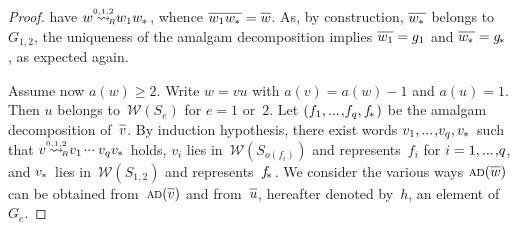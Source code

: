 \documentclass{amsart}
\numberwithin{equation}{section}
\theoremstyle{plain}
\theoremstyle{definition}
\let\ge=\geqslant
\begin{document}
\begin{proof}
have ${w} {\mathrel{{\mathrel{\overset{\scriptscriptstyle 0,1,2}{\rightsquigarrow}}}_{\hspace{-0.9ex}{\scriptscriptstyle R}}}} {w}_1 {{w}_{\hspace{-0.1ex}*\hspace{0.2ex}}}$, whence ${\overline{\vrule width0pt height5pt{{w}_1 {{w}_{\hspace{-0.1ex}*\hspace{0.2ex}}}}}} = {\overline{\vrule width0pt height5pt{w}}}$. As, by construction, ${\overline{\vrule width0pt height5pt{{w}_{\hspace{-0.1ex}*\hspace{0.2ex}}}}}$ belongs to~${G}_{1,2}$, the uniqueness of the amalgam decomposition implies ${\overline{\vrule width0pt height5pt{{w}_1}}} = {g}_1$ and ${\overline{\vrule width0pt height5pt{{w}_{\hspace{-0.1ex}*\hspace{0.2ex}}}}} = {{g}_{\hspace{-0.2ex}*\hspace{0.2ex}}}$, as expected again.

Assume now ${a({w})} \ge 2$. Write ${w} = {v} {u}$ with ${a({v})} = {a({w})}-1$ and ${a({u})} = 1$. Then ${u}$ belongs to~${\mathcal{W}({{S}_{e}})}$ for ${e} = 1$ or~$2$. Let $({f}_1 {, ...\hspace{0.2ex},} {f}_{q}, {{f}_{\hspace{-0.3ex}*\hspace{0.2ex}}})$ be the amalgam decomposition of~${\overline{\vrule width0pt height5pt{v}}}$. By induction hypothesis, there exist words ${v}_1 {, ...\hspace{0.2ex},} {v}_{q}, {{v}_{\hspace{-0.1ex}*\hspace{0.2ex}}}$ such that ${v} {\mathrel{{\mathrel{\overset{\scriptscriptstyle 0,1,2}{\rightsquigarrow}}}_{\hspace{-0.9ex}{\scriptscriptstyle R}}}} {v}_1 {\hspace{0.2ex}{\cdot}{\cdot}{\cdot}\hspace{0.5ex}} {v}_{q} {{v}_{\hspace{-0.1ex}*\hspace{0.2ex}}}$ holds, ${v}_{i}$ lies in~${\mathcal{W}({{S}_{{o({{f}_{i}})}}})}$ and represents~${f}_{i}$ for ${i} = 1 {, ...\hspace{0.2ex},} {q}$, and ${{v}_{\hspace{-0.1ex}*\hspace{0.2ex}}}$ lies in~${\mathcal{W}({{S}_{1,2}})}$ and represents~${{f}_{\hspace{-0.3ex}*\hspace{0.2ex}}}$. We consider the various ways ${{\scriptstyle\mathrm{A\hspace{-0.1ex}D}}({{\overline{\vrule width0pt height5pt{w}}}})}$ can be obtained from~${{\scriptstyle\mathrm{A\hspace{-0.1ex}D}}({{\overline{\vrule width0pt height5pt{v}}}})}$ and from~${\overline{\vrule width0pt height5pt{u}}}$, hereafter denoted by~${h}$, an element of~${G}_{e}$.


\end{proof}
\end{document}
